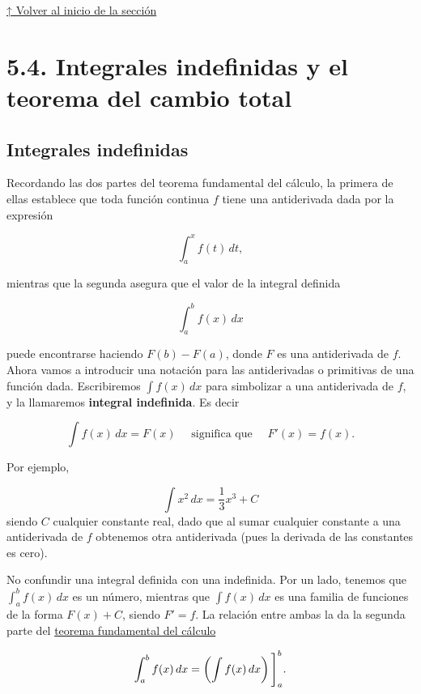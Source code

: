 \documentclass[
  letterpaper,
]{book}
\theoremstyle{plain}
\theoremstyle{remark}
\begin{document}
\hyperref[seccion_5.3]{↑ Volver al inicio de la sección}

\section{5.4. Integrales indefinidas y el teorema del cambio
total}\label{seccion_5.4}

\subsection{Integrales indefinidas}\label{integrales-indefinidas}

Recordando las dos partes del teorema fundamental del cálculo, la
primera de ellas establece que toda función continua \(f\) tiene una
antiderivada dada por la expresión

\[
\int_a^x f(t)\,dt,
\]

mientras que la segunda asegura que el valor de la integral definida

\[
\int_a^b f(x)\,dx
\]

puede encontrarse haciendo \(F(b)-F(a)\), donde \(F\) es una
antiderivada de \(f\). Ahora vamos a introducir una notación para las
antiderivadas o primitivas de una función dada. Escribiremos
\(\displaystyle \int f(x)\,dx\) para simbolizar a una antiderivada de
\(f\), y la llamaremos \textbf{integral indefinida}. Es decir

\[
\int f(x)\,dx=F(x) \quad \text{ significa que }\quad F'(x)=f(x).
\]

Por ejemplo,

\[
\int x^2\,dx =\frac{1}{3}x^3+C
\] siendo \(C\) cualquier constante real, dado que al sumar cualquier
constante a una antiderivada de \(f\) obtenemos otra antiderivada (pues
la derivada de las constantes es cero).

\begin{tcolorbox}[enhanced jigsaw, opacityback=0, left=2mm, opacitybacktitle=0.6, toprule=.15mm, bottomrule=.15mm, colbacktitle=quarto-callout-caution-color!10!white, titlerule=0mm, bottomtitle=1mm, title=\textcolor{quarto-callout-caution-color}{\faFire}\hspace{0.5em}{Importante}, toptitle=1mm, colframe=quarto-callout-caution-color-frame, colback=white, breakable, rightrule=.15mm, arc=.35mm, leftrule=.75mm, coltitle=black]

No confundir una integral definida con una indefinida. Por un lado,
tenemos que \(\int_a^b f(x)\,dx\) es un número, mientras que
\(\int f(x)\,dx\) es una familia de funciones de la forma \(F(x)+C\),
siendo \(F'=f\). La relación entre ambas la da la segunda parte del
\hyperref[teo-TFC2]{teorema fundamental del cálculo}

\[
\int_a^b f(x)\,dx =\left(\int f(x)\,dx\right)\Bigg{]}_a^b.
\]

\end{tcolorbox}
\end{document}
